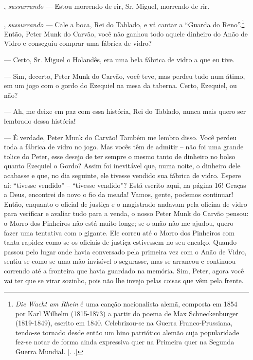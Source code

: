 \begin{myparindent}{0pt}
\begin{Parskip}
, \emph{sussurrando} --- Estou morrendo de rir, Sr. Miguel,
morrendo de rir.

, \emph{sussurrando} --- Cale a boca, Rei do Tablado, e
vá cantar a ``Guarda do Reno''.\footnote{\emph{Die Wacht am Rhein} é uma
  canção nacionalista alemã, composta em 1854 por Karl Wilhelm
  (1815-1873) a partir do poema de Max Schneckenburger (1819-1849),
  escrito em 1840. Celebrizou-se na Guerra Franco-Prussiana, tendo-se
  tornado desde então um hino patriótico alemão cuja popularidade fez-se
  notar de forma ainda expressiva quer na Primeira quer na Segunda
  Guerra Mundial. [. .]} Então, Peter Munk do Carvão, você não
ganhou todo aquele dinheiro do Anão de Vidro e conseguiu comprar uma
fábrica de vidro?

 --- Certo, Sr. Miguel o Holandês, era uma bela
fábrica de vidro a que eu tive.

 --- Sim, decerto, Peter Munk do Carvão, você teve, mas
perdeu tudo num átimo, em um jogo com o gordo do Ezequiel na mesa da
taberna. Certo, Ezequiel, ou não?

 --- Ah, me deixe em paz com essa história, Rei do Tablado, nunca
mais quero ser lembrado dessa história!

 --- É verdade, Peter Munk do Carvão! Também me lembro disso. Você
perdeu toda a fábrica de vidro no jogo. Mas vocês têm de admitir -- não
foi uma grande tolice do Peter, esse desejo de ter sempre o mesmo tanto
de dinheiro no bolso quanto Ezequiel o Gordo? Assim foi inevitável que,
numa noite, o dinheiro dele acabasse e que, no dia seguinte, ele tivesse
vendido sua fábrica de vidro. Espere aí: ``tivesse vendido'' --
``tivesse vendido''? Está escrito aqui, na página 16! Graças a Deus,
encontrei de novo o fio da meada! Vamos, gente, podemos continuar!
Então, enquanto o oficial de justiça e o magistrado andavam pela oficina
de vidro para verificar e avaliar tudo para a venda, o nosso Peter Munk
do Carvão pensou: o Morro dos Pinheiros não está muito longe; se o anão
não me ajudou, quero fazer uma tentativa com o gigante. Ele correu até o
Morro dos Pinheiros com tanta rapidez como se os oficiais de justiça
estivessem no seu encalço. Quando passou pelo lugar onde havia
conversado pela primeira vez com o Anão de Vidro, sentiu-se como se uma
mão invisível o segurasse, mas se arrancou e continuou correndo até a
fronteira que havia guardado na memória. Sim, Peter, agora você vai ter
que se virar sozinho, pois não lhe invejo pelas coisas que vêm pela
frente.


\end{Parskip}
\end{myparindent}
